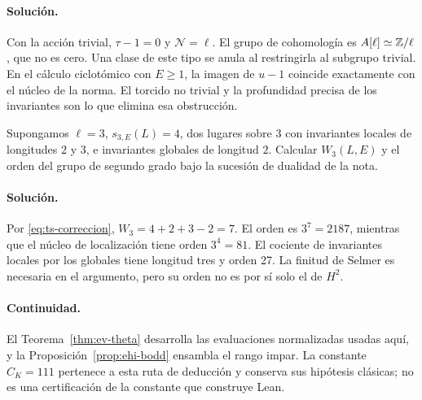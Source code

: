 \paragraph{Solución.} Con la acción trivial, $\tau-1=0$ y $\mathcal N=\ell$. El grupo de cohomología es $A[\ell]\simeq\mathbb{Z}/\ell$, que no es cero. Una clase de este tipo se anula al restringirla al subgrupo trivial. En el cálculo ciclotómico con $E\ge1$, la imagen de $u-1$ coincide exactamente con el núcleo de la norma. El torcido no trivial y la profundidad precisa de los invariantes son lo que elimina esa obstrucción.

\begin{ejercicio}
Supongamos $\ell=3$, $s_{3,E}(L)=4$, dos lugares sobre $3$ con invariantes locales de longitudes $2$ y $3$, e invariantes globales de longitud $2$. Calcular $W_3(L,E)$ y el orden del grupo de segundo grado bajo la sucesión de dualidad de la nota.
\end{ejercicio}
\paragraph{Solución.} Por \eqref{eq:ts-correccion}, $W_3=4+2+3-2=7$. El orden es $3^7=2187$, mientras que el núcleo de localización tiene orden $3^4=81$. El cociente de invariantes locales por los globales tiene longitud tres y orden 27. La finitud de Selmer es necesaria en el argumento, pero su orden no es por sí solo el de $H^2$.

\paragraph{Continuidad.} El Teorema~\ref{thm:ev-theta} desarrolla las evaluaciones normalizadas usadas aquí, y la Proposición~\ref{prop:ehi-bodd} ensambla el rango impar. La constante $C_K=111$ pertenece a esta ruta de deducción y conserva sus hipótesis clásicas; no es una certificación de la constante que construye Lean.